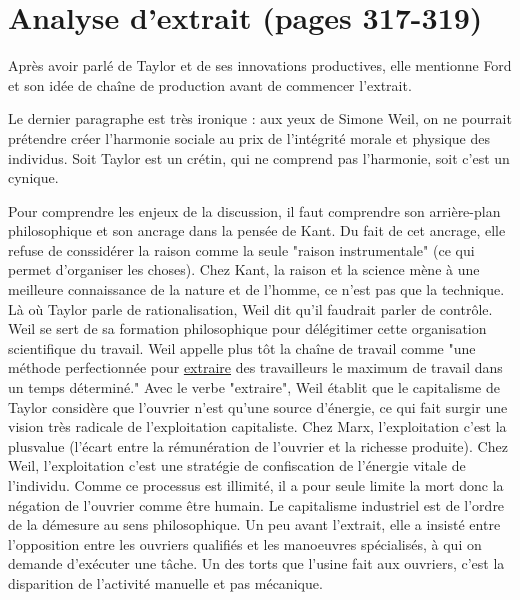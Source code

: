 \documentclass[a4paper,12pt]{book}
\begin{document}
\section{Analyse d'extrait (pages 317-319)}
Après avoir parlé de Taylor et de ses innovations productives, elle mentionne Ford et son idée de chaîne de production avant de commencer l'extrait.
\par Le dernier paragraphe est très ironique : aux yeux de Simone Weil, on ne pourrait prétendre créer l'harmonie sociale au prix de l'intégrité morale et physique des individus. Soit Taylor est un crétin, qui ne comprend pas l'harmonie, soit c'est un cynique.
\par Pour comprendre les enjeux de la discussion, il faut comprendre son arrière-plan philosophique et son ancrage dans la pensée de Kant. Du fait de cet ancrage, elle refuse de conssidérer la raison comme la seule "raison instrumentale" (ce qui permet d'organiser les choses). Chez Kant, la raison et la science mène à une meilleure connaissance de la nature et de l'homme, ce n'est pas que la technique. Là où Taylor parle de rationalisation, Weil dit qu'il faudrait parler de contrôle. Weil se sert de sa formation philosophique pour délégitimer cette organisation scientifique du travail. Weil appelle plus tôt la chaîne de travail comme "une méthode perfectionnée pour \underline{extraire} des travailleurs le maximum de travail dans un temps déterminé." Avec le verbe "extraire", Weil établit que le capitalisme de Taylor considère que l'ouvrier n'est qu'une source d'énergie, ce qui fait surgir une vision très radicale de l'exploitation capitaliste. Chez Marx, l'exploitation c'est la plusvalue (l'écart entre la rémunération de l'ouvrier et la richesse produite). Chez Weil, l'exploitation c'est une stratégie de confiscation de l'énergie vitale de l'individu. Comme ce processus est illimité, il a pour seule limite la mort donc la négation de l'ouvrier comme être humain. Le capitalisme industriel est de l'ordre de la démesure au sens philosophique. Un peu avant l'extrait, elle a insisté entre l'opposition entre les ouvriers qualifiés et les manoeuvres spécialisés, à qui on demande d'exécuter une tâche. Un des torts que l'usine fait aux ouvriers, c'est la disparition de l'activité manuelle et pas mécanique.
\end{document}
